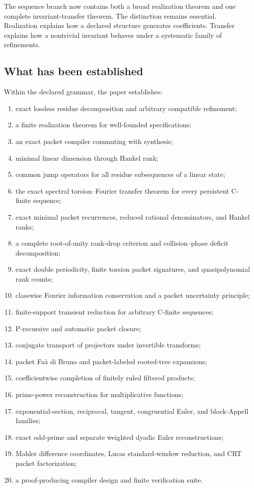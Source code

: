 \documentclass[11pt]{article}
\theoremstyle{definition}\newtheorem{definition}[theorem]{Definition}\newtheorem{example}[theorem]{Example}\newtheorem{construction}[theorem]{Construction}\newtheorem{algorithm}[theorem]{Algorithm}\newtheorem{conjecture}[theorem]{Conjecture}\newtheorem{problem}[theorem]{Problem}
\theoremstyle{remark}\newtheorem{remark}[theorem]{Remark}\newtheorem{boundary}[theorem]{Boundary}\newtheorem{certificate}[theorem]{Computational Certificate}\newtheorem{classical}[theorem]{Classical Input}\newtheorem{principle}[theorem]{Structural Principle}
\begin{document}
The sequence branch now contains both a broad realization theorem and one complete invariant-transfer theorem.  The distinction remains essential.  Realization explains how a declared structure generates coefficients.  Transfer explains how a nontrivial invariant behaves under a systematic family of refinements.

\subsection{What has been established}
Within the declared grammar, the paper establishes:
\begin{enumerate}
\item exact lossless residue decomposition and arbitrary compatible refinement;
\item a finite realization theorem for well-founded specifications;
\item an exact packet compiler commuting with synthesis;
\item minimal linear dimension through Hankel rank;
\item common jump operators for all residue subsequences of a linear state;
\item the exact spectral torsion--Fourier transfer theorem for every persistent C-finite sequence;
\item exact minimal packet recurrences, reduced rational denominators, and Hankel ranks;
\item a complete root-of-unity rank-drop criterion and collision--phase deficit decomposition;
\item exact double periodicity, finite torsion packet signatures, and quasipolynomial rank counts;
\item classwise Fourier information conservation and a packet uncertainty principle;
\item finite-support transient reduction for arbitrary C-finite sequences;
\item P-recursive and automatic packet closure;
\item conjugate transport of projectors under invertible transforms;
\item packet Fa\`a di Bruno and packet-labeled rooted-tree expansions;
\item coefficientwise completion of finitely ruled filtered products;
\item prime-power reconstruction for multiplicative functions;
\item exponential-section, reciprocal, tangent, congruential Euler, and block-Appell families;
\item exact odd-prime and separate weighted dyadic Euler reconstructions;
\item Mahler difference coordinates, Lucas standard-window reduction, and CRT packet factorization;
\item a proof-producing compiler design and finite verification suite.
\end{enumerate}
\end{document}
